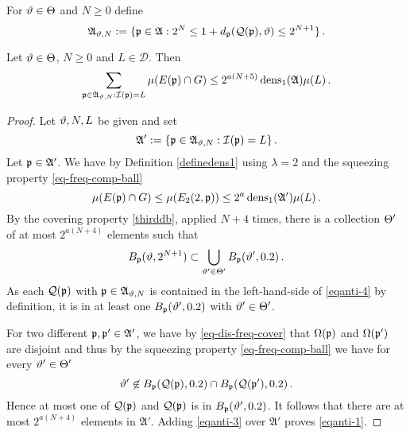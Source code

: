 For ${\vartheta} \in {\Theta}$ and $N\ge 0$ define
\begin{equation}\label{eqantidefap}
    \mathfrak{A}_{{\vartheta},N}:=\{{\mathfrak p}\in\mathfrak{A}: 2^{N}\le 1+d_{{\mathfrak p}}({\mathcal{Q}}({\mathfrak p}), {\vartheta})\le 2^{N+1}\} \, .
\end{equation}


\begin{lemma}
\label{stack-density}
\leanok
{}
Let ${\vartheta} \in {\Theta}$, $N\ge 0$ and
$L\in \mathcal{D}$. Then
\begin{equation}\label{eqanti-1}
    \sum_{{\mathfrak p}\in\mathfrak{A}_{{\vartheta},N}:{\mathcal{I}}({\mathfrak p})=L}\mu(E({\mathfrak p})\cap G)\le 2^{a(N+5)}\operatorname{\operatorname{dens}}_1(\mathfrak{A})\mu(L)\, .
\end{equation}
\end{lemma}
\begin{proof}
Let ${\vartheta},N,L$ be given and set
\begin{equation}
\mathfrak{A}':=\{{\mathfrak p}\in\mathfrak{A}_{{\vartheta},N}:{\mathcal{I}}({\mathfrak p})=L\}\, .
\end{equation}
Let
${\mathfrak p}\in\mathfrak{A}'$.
We have
by Definition \eqref{definedens1}
using $\lambda=2$ and the squeezing property \eqref{eq-freq-comp-ball}
\begin{equation}\label{eqanti-3}
\mu(E({\mathfrak p})\cap G)\le \mu(E_2(2, {\mathfrak p}))\le 2^{a}\operatorname{\operatorname{dens}}_1(\mathfrak{A}')\mu(L)\, .
\end{equation}
By the covering property \eqref{thirddb}, applied $N+4$ times, there is a collection ${\Theta}'$ of at most $2^{a(N+4)}$
elements such that
\begin{equation}\label{eqanti-4}
    B_{{\mathfrak p}}({\vartheta}, 2^{N+1})\subset \bigcup_{{\vartheta}'\in {\Theta}'}
    B_{{\mathfrak p}}({\vartheta}', 0.2)\, .
\end{equation}
As each ${\mathcal{Q}}({\mathfrak p})$ with ${\mathfrak p}\in \mathfrak{A}_{{\vartheta},N}$
is contained in the left-hand-side
of \eqref{eqanti-4}
by definition, it is in at least one $B_{{\mathfrak p}}({\vartheta}', 0.2)$
with ${\vartheta}'\in {\Theta}'$.


For two different ${\mathfrak p},{\mathfrak p}'\in \mathfrak{A}'$, we have by
\eqref{eq-dis-freq-cover} that
${\Omega}({\mathfrak p})$ and ${\Omega}({\mathfrak p}')$ are disjoint and thus by the squeezing property \eqref{eq-freq-comp-ball} we have for every ${\vartheta}'\in {\Theta}'$
\begin{equation}
    {\vartheta}'\not\in B_{{\mathfrak p}}({\mathcal{Q}}({\mathfrak p}), 0.2)\cap
B_{{\mathfrak p}}({\mathcal{Q}}({\mathfrak p}'), 0.2)\, .
\end{equation}
Hence at most one of ${\mathcal{Q}}({\mathfrak p})$
and ${\mathcal{Q}}({\mathfrak p})$ is in
$B_{{\mathfrak p}}({\vartheta}', 0.2)$.
It follows that there are at most $2^{a(N+4)}$ elements in
$\mathfrak{A}'$. Adding \eqref{eqanti-3} over $\mathfrak{A}'$ proves
\eqref{eqanti-1}.
\end{proof}


